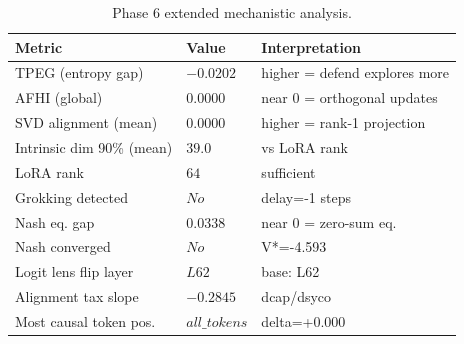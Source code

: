 \begin{table}[t]
\centering
\caption{Phase 6 extended mechanistic analysis.}
\label{tab:phase6_summary}
\begin{tabular}{lll}
\toprule
Metric & Value & Interpretation \\
\midrule
TPEG (entropy gap) & $-0.0202$ & higher = defend explores more \\
AFHI (global) & $0.0000$ & near 0 = orthogonal updates \\
SVD alignment (mean) & $0.0000$ & higher = rank-1 projection \\
Intrinsic dim 90\% (mean) & $39.0$ & vs LoRA rank \\
LoRA rank & $64$ & sufficient \\
Grokking detected & $No$ & delay=-1 steps \\
Nash eq. gap & $0.0338$ & near 0 = zero-sum eq. \\
Nash converged & $No$ & V*=-4.593 \\
Logit lens flip layer & $L62$ & base: L62 \\
Alignment tax slope & $-0.2845$ & dcap/dsyco \\
Most causal token pos. & $all\_tokens$ & delta=+0.000 \\
\bottomrule
\end{tabular}
\end{table}